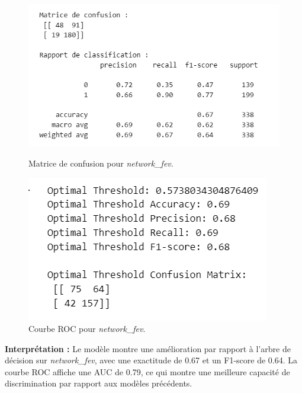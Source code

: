 \begin{figure}[H]
    \centering
    \begin{minipage}{0.45\linewidth}
        \centering
        \includegraphics[width=\linewidth]{capture_modele_9.png}
        \caption{Matrice de confusion pour \textit{network\_fev}.}
    \end{minipage}
    \hfill
    \begin{minipage}{0.45\linewidth}
        \centering
        \includegraphics[width=\linewidth]{capture_modele_10.png}
        \caption{Courbe ROC pour \textit{network\_fev}.}
    \end{minipage}
\end{figure}

\textbf{Interprétation :} Le modèle montre une amélioration par rapport à l'arbre de décision sur \textit{network\_fev}, avec une exactitude de 0.67 et un F1-score de 0.64. La courbe ROC affiche une AUC de 0.79, ce qui montre une meilleure capacité de discrimination par rapport aux modèles précédents.

